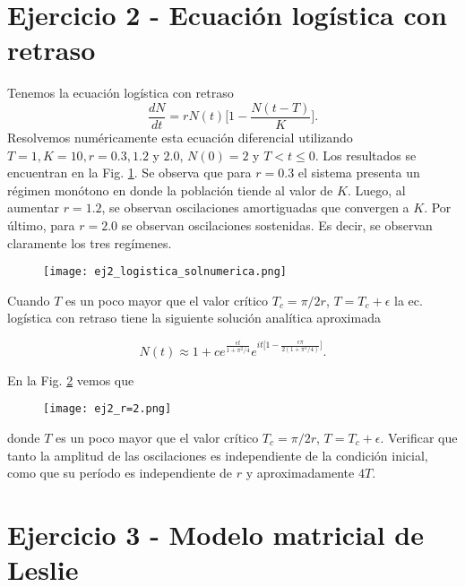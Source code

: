 \documentclass[letterpaper,12pt]{article}
\theoremstyle{plain}
\begin{document}
\section*{Ejercicio 2 - Ecuación logística con retraso}

Tenemos la ecuación logística con retraso
\begin{equation}
    \frac{dN}{dt} = rN(t) \biggr[ 1 - \frac{N (t - T)}{K} \biggr].
\end{equation}
Resolvemos numéricamente esta ecuación diferencial utilizando $T = 1, K = 10, r = 0.3, 1.2$ y $2.0$, $N(0) = 2$ y $T < t \leq 0$. Los resultados se encuentran en la Fig. \ref*{fig:ej2_logistica_solnumerica}. Se observa que para $r=0.3$ el sistema presenta un régimen monótono en donde la población tiende al valor de $K$. Luego, al aumentar $r=1.2$, se observan oscilaciones amortiguadas que convergen a $K$. Por último, para $r=2.0$ se observan oscilaciones sostenidas. Es decir, se observan claramente los tres regímenes.

\begin{figure}[h]
    \centering
    \texttt{[image: ej2\_logistica\_solnumerica.png]}
    \caption{} 
    \label{fig:ej2_logistica_solnumerica}
\end{figure}

Cuando $T$ es un poco mayor que el valor crítico $T_c = \pi/2r$, $T = T_c + \epsilon$ la ec. logística con retraso tiene la siguiente solución analítica aproximada

\begin{equation}
    N(t) \approx 1 + c e^{\frac{\epsilon t}{1 + \pi^2/4}} e^{it \biggr[ 1 - \frac{\epsilon \pi}{2 (1 + \pi^2/4)}\biggr]}.
\end{equation}

En la Fig. \ref*{fig:ej2_r=2} vemos que 

\begin{figure}[h]
    \centering
    \texttt{[image: ej2\_r=2.png]}
    \caption{} 
    \label{fig:ej2_r=2}
\end{figure}


donde $T$ es un poco mayor que el valor crítico $T_c = \pi/2r$, $T = T_c + \epsilon$. Verificar que tanto la amplitud de las oscilaciones es independiente de la condición inicial, como que su período es independiente de $r$ y aproximadamente $4T$.


\section*{Ejercicio 3 - Modelo matricial de Leslie}
\end{document}
